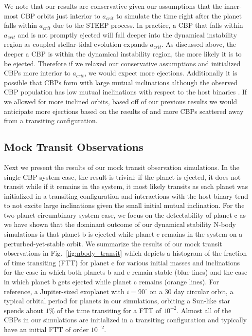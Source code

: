 We note that our results are conservative given our assumptions that the inner-most CBP orbits just interior to $a_{crit}$ to simulate the time right after the planet falls within $a_{crit}$ due to the STEEP process. In practice, a CBP that falls within $a_{crit}$ and is not promptly ejected will fall deeper into the dynamical instability region as coupled stellar-tidal evolution expands $a_{crit}$.  As discussed above, the deeper a CBP is within the dynamical instability region, the more likely it is to be ejected.  Therefore if we relaxed our conservative assumptions and initialized CBPs more interior to $a_{crit}$, we would expect more ejections.  Additionally it is possible that CBPs form with large mutual inclinations although the observed CBP population has low mutual inclinations with respect to the host binaries \citep{Li2016}.  If we allowed for more inclined orbits, based off of our previous results we would anticipate more ejections based on the results of \citet{Chatterjee2008} and more CBPs scattered away from a transiting configuration.  

\subsection{Mock Transit Observations} \label{sec:nbody_observation}

Next we present the results of our mock transit observation simulations.  In the single CBP system case, the result is trivial: if the planet is ejected, it does not transit while if it remains in the system, it most likely transits as each planet was initialized in a transiting configuration and interactions with the host binary tend to not excite large inclinations given the small initial mutual inclination.  For the two-planet circumbinary system case, we focus on the detectability of planet c as we have shown that the dominant outcome of our dynamical stability N-body simulations is that planet b is ejected while planet c remains in the system on a perturbed-yet-stable orbit.  We summarize the results of our mock transit observations in Fig.~\ref{fig:nbody_transit} which depicts a histogram of the fraction of time transiting (FTT) for planet c for various initial masses and inclinations for the case in which both planets b and c remain stable (blue lines) and the case in which planet b gets ejected while planet c remains (orange lines).  For reference, a Jupiter-sized exoplanet with $i=90^{\circ}$ on a 30 day circular orbit, a typical orbital period for planets in our simulations, orbiting a Sun-like star spends about $1\%$ of the time transiting for a FTT of $10^{-2}$.  Almost all of the CBPs in our simulations are initialized in a transiting configuration and typically have an initial FTT of order $10^{-2}$.  


